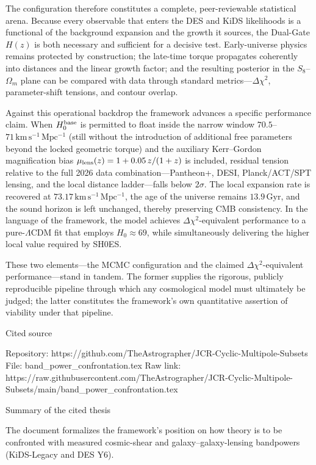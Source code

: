 The configuration therefore constitutes a complete, peer-reviewable statistical arena. Because every observable that enters the DES and KiDS likelihoods is a functional of the background expansion and the growth it sources, the Dual-Gate \(H(z)\) is both necessary and sufficient for a decisive test. Early-universe physics remains protected by construction; the late-time torque propagates coherently into distances and the linear growth factor; and the resulting posterior in the \(S_8\)–\(\Omega_m\) plane can be compared with data through standard metrics—\(\Delta\chi^2\), parameter-shift tensions, and contour overlap.

Against this operational backdrop the framework advances a specific performance claim. When \(H_0^{\rm base}\) is permitted to float inside the narrow window \(70.5\)–\(71\,\mathrm{km\,s^{-1}\,Mpc^{-1}}\) (still without the introduction of additional free parameters beyond the locked geometric torque) and the auxiliary Kerr–Gordon magnification bias \(\mu_{\rm lens}(z)=1+0.05\,z/(1+z)\) is included, residual tension relative to the full 2026 data combination—Pantheon+, DESI, Planck/ACT/SPT lensing, and the local distance ladder—falls below \(2\sigma\). The local expansion rate is recovered at \(73.17\,\mathrm{km\,s^{-1}\,Mpc^{-1}}\), the age of the universe remains \(13.9\,\mathrm{Gyr}\), and the sound horizon is left unchanged, thereby preserving CMB consistency. In the language of the framework, the model achieves \(\Delta\chi^2\)-equivalent performance to a pure-\(\Lambda\)CDM fit that employs \(H_0\approx69\), while simultaneously delivering the higher local value required by SH0ES.

These two elements—the MCMC configuration and the claimed \(\Delta\chi^2\)-equivalent performance—stand in tandem. The former supplies the rigorous, publicly reproducible pipeline through which any cosmological model must ultimately be judged; the latter constitutes the framework’s own quantitative assertion of viability under that pipeline.

Cited source

Repository: https://github.com/TheAstrographer/JCR-Cyclic-Multipole-Subsets  
File: band_power_confrontation.tex  
Raw link: https://raw.githubusercontent.com/TheAstrographer/JCR-Cyclic-Multipole-Subsets/main/band_power_confrontation.tex

Summary of the cited thesis

The document formalizes the framework’s position on how theory is to be confronted with measured cosmic-shear and galaxy–galaxy-lensing bandpowers (KiDS-Legacy and DES Y6).

